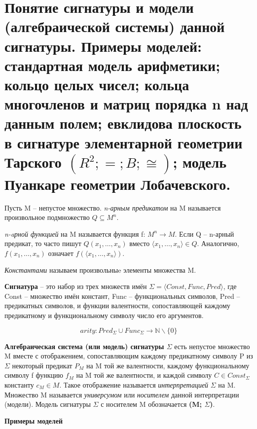 \section{Понятие сигнатуры и модели (алгебраической системы) данной сигнатуры. Примеры моделей: стандартная модель
арифметики; кольцо целых чисел; кольца многочленов и матриц порядка n над данным полем; евклидова плоскость в
сигнатуре элементарной геометрии Тарского $(R^{2}; =; B; \cong)$; модель Пуанкаре геометрии Лобачевского.}

\begin{definition}
	Пусть M -- непустое множество. \textit{n-арным предикатом} на M называется произвольное подмножество $Q
	\subseteq M^{n}$.

	\textit{n-aрной функцией} на M называется функция f: $M^{n}\to M$.
	Если Q -- n-арный предикат, то часто пишут $Q(x_1, \ldots , x_n)$ вместо $\langle x_1, \ldots , x_n \rangle \in
	Q$. Аналогично, $f(x_1, \ldots , x_n)$ означает $f (\langle x_1, \ldots , x_n \rangle)$.

	\textit{Константами} называем произвольныe элементы множества M.

	\textbf{Сигнатура} -- это набор из трех множеств имён $\varSigma =  \langle Const, Func, Pred \rangle $, где
	Const -- множество имён констант, Func -- функциональных символов, Pred -- предикатных символов, и функции
	валентности, сопоставляющей каждому предикатному и функциональному символу число его
	аргументов.$\label{formula2}$

	$$arity : Pred_\Sigma \cup Func_\Sigma \rightarrow \mathbb{N} \backslash\{0\}$$
\end{definition}

\begin{definition}
	\textbf{Алгебраическая система (или модель) сигнатуры $\varSigma $} есть непустое множество M вместе с
	отображением, сопоставляющим каждому предикатному символу P из $\varSigma $ некоторый предикат $P_{M}$ на M той же
	валентности, каждому функциональному символу f функцию $f_{M}$ на M той же валентности, и каждой символу $C \in
	Const_{\varSigma} $ константу $c_{M} \in M$. Такое отображение называется \textit{интерпретацией} $\varSigma $ на
	M. Множество M называется \textit{универсумом} или \textit{носителем} данной интерпретации (модели). Модель
	сигнатуры $\varSigma $ с носителем M обозначается \textbf{(M; $\varSigma$)}. $\label{formula3}$
\end{definition}

\begin{center}
	\textbf{Примеры моделей}
\end{center}

